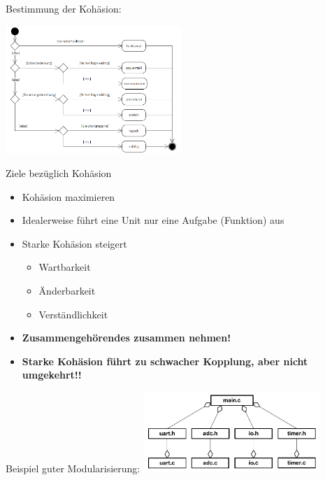 \begin{multicols}{2}
Bestimmung der Kohäsion:
\begin{center}
{\includegraphics[width=0.5\textwidth]{images/Modularisierung/Kohaesionsbestimmung.png}}
\end{center}

\columnbreak

Ziele bezüglich Kohäsion
\begin{itemize}
  \item Kohäsion maximieren
  \item Idealerweise führt eine Unit nur eine Aufgabe (Funktion) aus
  \item Starke Kohäsion steigert
  \begin{itemize}
    \item Wartbarkeit
    \item Änderbarkeit
    \item Verständlichkeit
  \end{itemize}
  \item \textbf{Zusammengehörendes zusammen nehmen!}
  \item \textbf{Starke Kohäsion führt zu schwacher Kopplung, aber nicht umgekehrt!!}
\end{itemize}
\end{multicols}
\begin{center}
Beispiel guter Modularisierung:
{\includegraphics[width=0.5\textwidth]{images/Modularisierung/GutesBeispielModularisierung.png}}
\end{center}